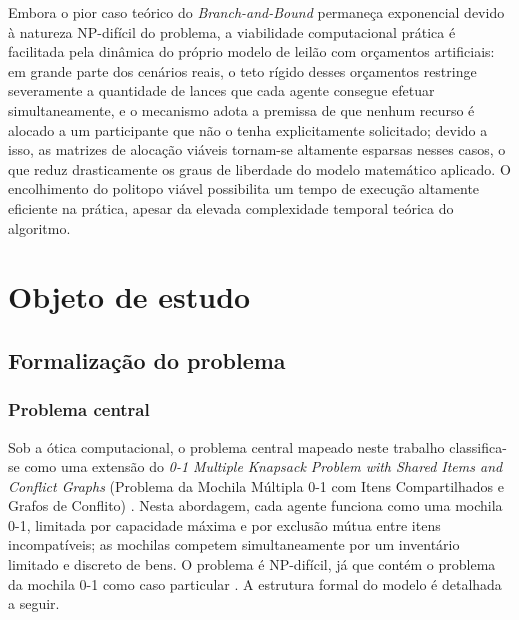 \documentclass[
    12pt,
    openany,
    oneside,
    a4paper,
    english,
    brazil
]{abntex2}
\begin{document}

Embora o pior caso teórico do \textit{Branch-and-Bound} permaneça exponencial devido à natureza NP-difícil do problema, a viabilidade computacional prática é facilitada pela dinâmica do próprio modelo de leilão com orçamentos artificiais: em grande parte dos cenários reais, o teto rígido desses orçamentos restringe severamente a quantidade de lances que cada agente consegue efetuar simultaneamente, e o mecanismo adota a premissa de que nenhum recurso é alocado a um participante que não o tenha explicitamente solicitado; devido a isso, as matrizes de alocação viáveis tornam-se altamente esparsas nesses casos, o que reduz drasticamente os graus de liberdade do modelo matemático aplicado. O encolhimento do politopo viável possibilita um tempo de execução altamente eficiente na prática, apesar da elevada complexidade temporal teórica do algoritmo.

\chapter{Objeto de estudo}

\section{Formalização do problema}
\label{cap:problema}

\subsection{Problema central}
\label{sec:formalizacao}

Sob a ótica computacional, o problema central mapeado neste trabalho classifica-se como uma extensão do \textit{0-1 Multiple Knapsack Problem with Shared Items and Conflict Graphs} (Problema da Mochila Múltipla 0-1 com Itens Compartilhados e Grafos de Conflito) \cite{kellerer2004}. Nesta abordagem, cada agente funciona como uma mochila 0-1, limitada por capacidade máxima e por exclusão mútua entre itens incompatíveis; as mochilas competem simultaneamente por um inventário limitado e discreto de bens. O problema é NP-difícil, já que contém o problema da mochila 0-1 como caso particular \cite{kellerer2004}. A estrutura formal do modelo é detalhada a seguir.
\end{document}
